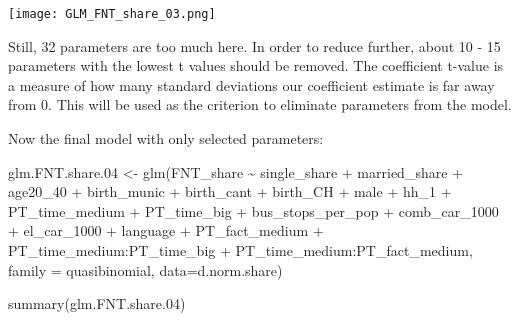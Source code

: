 \documentclass[
]{article}
\newenvironment{Shaded}{\begin{snugshade}}{\end{snugshade}}
\newcommand{\AttributeTok}[1]{\textcolor[rgb]{0.77,0.63,0.00}{#1}}
\newcommand{\FloatTok}[1]{\textcolor[rgb]{0.00,0.00,0.81}{#1}}
\newcommand{\FunctionTok}[1]{\textcolor[rgb]{0.00,0.00,0.00}{#1}}
\newcommand{\NormalTok}[1]{#1}
\newcommand{\OtherTok}[1]{\textcolor[rgb]{0.56,0.35,0.01}{#1}}
\newcommand{\SpecialCharTok}[1]{\textcolor[rgb]{0.00,0.00,0.00}{#1}}
\begin{document}
\texttt{[image: GLM\_FNT\_share\_03.png]}

Still, 32 parameters are too much here. In order to reduce further,
about 10 - 15 parameters with the lowest t values should be removed. The
coefficient t-value is a measure of how many standard deviations our
coefficient estimate is far away from 0. This will be used as the
criterion to eliminate parameters from the model.

Now the final model with only selected parameters:

\begin{Shaded}
\begin{Highlighting}[]
\NormalTok{glm.FNT.share}\FloatTok{.04} \OtherTok{\textless{}{-}} \FunctionTok{glm}\NormalTok{(FNT\_share }\SpecialCharTok{\textasciitilde{}}\NormalTok{ single\_share }\SpecialCharTok{+}\NormalTok{ married\_share }\SpecialCharTok{+} 
\NormalTok{                          age20\_40 }\SpecialCharTok{+}\NormalTok{ birth\_munic }\SpecialCharTok{+}\NormalTok{ birth\_cant }\SpecialCharTok{+} 
\NormalTok{                          birth\_CH }\SpecialCharTok{+}\NormalTok{ male }\SpecialCharTok{+}\NormalTok{ hh\_1 }\SpecialCharTok{+}\NormalTok{ PT\_time\_medium }\SpecialCharTok{+} 
\NormalTok{                          PT\_time\_big }\SpecialCharTok{+}\NormalTok{ bus\_stops\_per\_pop }\SpecialCharTok{+} 
\NormalTok{                          comb\_car\_1000 }\SpecialCharTok{+}\NormalTok{ el\_car\_1000 }\SpecialCharTok{+}\NormalTok{ language }\SpecialCharTok{+} 
\NormalTok{                          PT\_fact\_medium }\SpecialCharTok{+}\NormalTok{ PT\_time\_medium}\SpecialCharTok{:}\NormalTok{PT\_time\_big }\SpecialCharTok{+} 
\NormalTok{                          PT\_time\_medium}\SpecialCharTok{:}\NormalTok{PT\_fact\_medium, }
                \AttributeTok{family =}\NormalTok{ quasibinomial, }\AttributeTok{data=}\NormalTok{d.norm.share)}

\FunctionTok{summary}\NormalTok{(glm.FNT.share}\FloatTok{.04}\NormalTok{)}
\end{Highlighting}
\end{Shaded}
\end{document}
